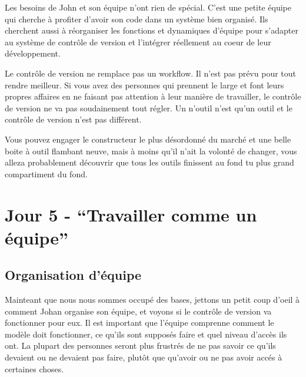 Les besoins de John et son équipe n'ont rien de spécial.
C'est une petite équipe qui cherche à profiter d'avoir son code dans un système bien organisé.
Ils cherchent aussi à réorganiser les fonctions et dynamiques d'équipe pour s'adapter au système de contrôle de version et l'intégrer réellement au coeur de leur développement.

Le contrôle de version ne remplace pas un workflow.
Il n'est pas prévu pour tout rendre meilleur.
Si vous avez des personnes qui prennent le large et font leurs propres affaires en ne faisant pas attention à leur manière de travailler, le contrôle de version ne va pas soudainement tout régler.
Un n'outil n'est qu'un outil et le contrôle de version n'est pas différent.

Vous pouvez engager le constructeur le plus désordonné du marché et une belle boite à outil flambant neuve, mais à moins qu'il n'ait la volonté de changer, vous alleza probablement découvrir que tous les outils finissent au fond tu plus grand compartiment du fond.

\section{Jour 5 - ``Travailler comme un équipe''}
\subsection{Organisation d'équipe}
Mainteant que nous nous sommes occupé des bases, jettons un petit coup d'oeil à comment Johan organise son équipe, et voyons si le contrôle de version va fonctionner pour eux.
Il est important que l'équipe comprenne comment le modèle doit fonctionner, ce qu'ils sont supposés faire et quel niveau d'accès ils ont.
La plupart des personnes seront plus frustrés de ne pas savoir ce qu'ils devaient ou ne devaient pas faire, plutôt que qu'avoir ou ne pas avoir accés à certaines choses.

